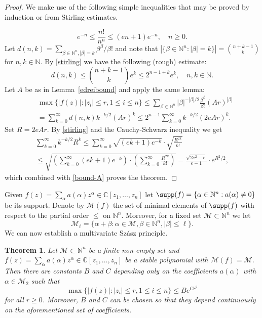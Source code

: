 \documentclass[10pt,reqno]{amsart}
\theoremstyle{plain}
\newtheorem{theorem}{Theorem}[section]
\theoremstyle{definition}
\theoremstyle{remark}
\numberwithin{equation}{section}
\newcommand{\NN}{\mathbb{N}}
\newcommand{\MM}{\mathcal{M}}
\newcommand{\CC}{\mathbb{C}}
\begin{document}
\begin{proof}
We make use of the following simple inequalities that may be proved by 
induction or from Stirling estimates.  

\begin{equation}\label{stirling}
e^{-n} \leq \frac {n!}{n^n} \leq (en+1)e^{-n}, \quad n \geq 0.
\end{equation}
Let 
$
d(n,k)= \sum_{\beta \in \NN^n, |\beta|=k} \beta^\beta/\beta!
$
and note that $\left|\{\beta \in \NN^n : |\beta|=k\}\right|
=\binom {n+k-1}{k}$ for $n,k\in \NN$. 
 By \eqref{stirling} we have the following (rough) estimate:
$$
d(n,k) \leq \binom {n+k-1}k e^k \leq 2^{n-1+k}e^k,\quad n,k\in \NN.
$$ 
Let $A$ be as in Lemma~\ref{edreibound} and apply the same lemma:
\begin{equation}\label{bound-A}
\begin{split}
&\max\Big\{ |f(z)| : |z_i|\leq r, 1\leq i \leq n\Big\} \leq 
\sum_{\beta\in\NN^n} |\beta|^{-|\beta|/2} 
\frac{\beta^\beta}{\beta!} (Ar)^{|\beta|} \\
&= \sum_{k=0}^{\infty} d(n,k)k^{-k/2}(Ar)^k 
\leq 2^{n-1} \sum_{k=0}^{\infty} k^{-k/2}(2eAr)^k.
\end{split}
\end{equation}              
Set $R=2eAr$. 
By \eqref{stirling} and the Cauchy-Schwarz inequality  we get 
\begin{multline*}
\sum_{k=0}^{\infty} k^{-k/2} R^k \leq\sum_{k=0}^\infty \sqrt{(ek+1)e^{-k}}  
\cdot \sqrt{\frac{R^{2k}}{k!}} \\
\le \sqrt{\left(\sum_{k=0}^\infty (ek+1)e^{-k}\right)   \cdot   
\left(\sum_{k=0}^\infty \frac{R^{2k}}{k!}\right)   } 
= \frac {\sqrt{2e^2-e}} {e-1} \cdot e^{R^2/2},
\end{multline*}
which combined with \eqref{bound-A} proves the theorem.
\end{proof}
 
Given $f(z)=\sum_{\alpha}a(\alpha)z^{\alpha}\in 
\CC[z_1,\ldots, z_n]$ let 
$\supp(f)=\{\alpha\in \NN^n : a(\alpha)\neq 0\}$ be its support.  Denote by
$\MM(f)$ the set of minimal elements of $\supp(f)$ with respect to the partial 
order $\le$ on $\NN^n$. Moreover, for a fixed set $\MM \subset \NN^n$ we let 
$$
\MM_\ell= \{ \alpha +\beta  : \alpha \in \MM, \beta \in \NN^n, 
|\beta| \leq \ell\}. 
$$ 
We can now establish a multivariate Sz\'asz principle.

\begin{theorem}\label{for_trans}
Let $\MM \subset \NN^n$ be a finite non-empty set and 
$f(z)=\sum_{\alpha}a(\alpha)z^\alpha\in 
\CC[z_1,\ldots, z_n]$ be a stable polynomial with $\MM(f)=\MM$. 
Then there are constants $B$ and $C$ depending  only on   
the coefficients 
$a(\alpha)$ with $\alpha \in \MM_2$  
such that 
$$
\max \Big\{ |f(z)| : |z_i| \leq r, 1\leq i \leq n\Big\} \leq B e^{Cr^2}
$$ 
for all $r\ge 0$. Moreover, $B$ and $C$ can be chosen so that they depend  
continuously on the aforementioned set of coefficients.  
\end{theorem}
\end{document}
